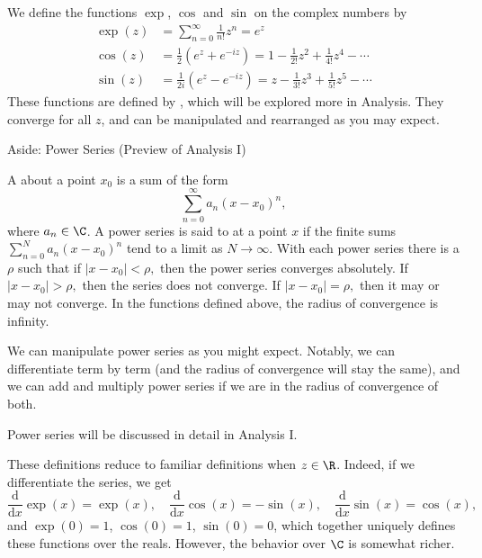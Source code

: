 \documentclass[a4paper]{scrreprt}
\begin{document}
We define the functions $\exp$, $\cos$ and $\sin$ on the complex numbers by
\begin{align*}
	\exp(z) &= \sum_{n = 0}^{\infty} \frac{1}{n!} z^n = e^z \\
	\cos(z) &= \frac{1}{2}(e^z + e^{-iz}) = 1 - \frac{1}{2!}z^2 + \frac{1}{4!} z^4 - \cdots \\
	\sin(z) &= \frac{1}{2i}(e^z - e^{-iz}) = z - \frac{1}{3!}z^3 + \frac{1}{5!}z^5 - \cdots
\end{align*}
These functions are defined by , which will be explored more in Analysis. They converge for all $z$, and can be manipulated and rearranged as you may expect.

\begin{aside}{Aside: Power Series (Preview of Analysis I)}

	A  about a point $x_0$ is a sum of the form
	$$
	\sum_{n = 0}^{\infty} a_n(x - x_0)^n,	
	$$
	where $a_n \in \C$. A power series is said to  at a point $x$ if the finite sums
	$
	\sum_{n = 0}^N a_n(x - x_0)^n
	$
	tend to a limit as $N \rightarrow \infty$. With each power series there is a  $\rho$ such that if $\left|x-x_{0}\right|<\rho,$ then the power series converges absolutely. If $\left|x-x_{0}\right|>\rho,$ then the series does not converge. If $\left|x-x_{0}\right|=\rho,$ then it may or may not converge. In the functions defined above, the radius of convergence is infinity.


	We can manipulate power series as you might expect. Notably, we can differentiate term by term (and the radius of convergence will stay the same), and we can add and multiply power series if we are in the radius of convergence of both.

	Power series will be discussed in detail in Analysis I.
	
\end{aside}

These definitions reduce to familiar definitions when $z \in \R$. Indeed, if we differentiate the series, we get
$$
	\frac{\mathrm{d}}{\mathrm{d}x} \exp(x) = \exp(x), \quad
	\frac{\mathrm{d}}{\mathrm{d}x}\cos(x) = -\sin(x), \quad
	\frac{\mathrm{d}}{\mathrm{d}x} \sin(x) = \cos(x),
$$
and $\exp(0) = 1$, $\cos(0) = 1$, $\sin(0) = 0$, which together uniquely defines these functions over the reals. However, the behavior over $\C$ is somewhat richer.
\end{document}
